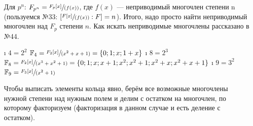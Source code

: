 \begin{solution}

Для \(p^n\): \(F_{p^n} = \sfrac{F_p[x]}{(f(x))}\), где \(f(x)\) --- неприводимый многочлен степени n (пользуемся №33: $[\sfrac{F[x]}{(f(x))}:F] = n$). Итого, надо просто найти неприводимый многочлен над \(F_p\) степени \(n\). Как искать неприводимые многочлены рассказано в №44.

\begin{enumerate}
\def\labelenumi{\alph{enumi})}
\tightlist
\i
  \(4=2^2\)
  \(\mathbb{F}_4 = \sfrac{F_2[x]}{(x^2+x+1)} = \{0; 1;x;1+x\}\)
\i
  \(8=2^3\)
  \(\mathbb{F}_8 = \sfrac{F_2[x]}{(x^3+x^2+1)} = \{0; 1; x; x+1; x^2; x^2+1; x^2+x; x^2+x+1 \}\)
\i
  \(9=3^2\)
  \(\mathbb{F}_9 = \sfrac{F_3[x]}{(x^2+1)}\)
\end{enumerate}

Чтобы выписать элементы кольца явно, берём все возможные многочлены нужной степени над нужным полем и делим с остатком на многочлен, по которому факторизуем (факторизация в данном случае и есть деление с остатком).

\end{solution}


